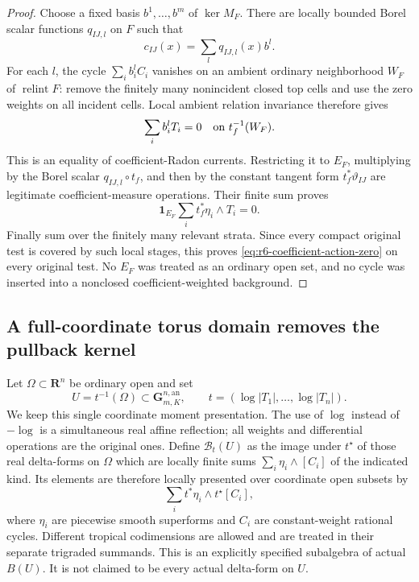 \documentclass[11pt,a4paper]{article}
\numberwithin{equation}{section}
\theoremstyle{definition}
\theoremstyle{remark}
\begin{document}
\begin{proof}
Choose a fixed basis $b^1,\ldots,b^m$ of $\ker M_F$.  There are
locally bounded Borel scalar functions $q_{IJ,l}$ on $F$ such that
\[
                          c_{IJ}(x)=\sum_lq_{IJ,l}(x)b^l.
\]
For each $l$, the cycle $\sum_i b_i^lC_i$ vanishes on an ambient
ordinary neighborhood $W_F$ of $\operatorname{relint}F$: remove
the finitely many nonincident closed top cells and use the zero
weights on all incident cells.  Local ambient relation invariance
therefore gives
\[
                         \sum_i b_i^lT_i=0
                             \quad\hbox{on }t_f^{-1}(W_F).
\]
This is an equality of coefficient-Radon currents.  Restricting
it to $E_F$, multiplying by the Borel scalar
$q_{IJ,l}\circ t_f$, and then by the constant tangent form
$t_f^*\vartheta_{IJ}$ are legitimate coefficient-measure operations.
Their finite sum proves
\[
           \mathbf1_{E_F}\sum_i t_f^*\eta_i\wedge T_i=0.
\]
Finally sum over the finitely many relevant strata.  Since every
compact original test is covered by such local stages, this proves
\eqref{eq:r6-coefficient-action-zero} on every original test.
No $E_F$ was treated as an ordinary open set, and no cycle was
inserted into a nonclosed coefficient-weighted background.
\end{proof}

\subsection{A full-coordinate torus domain removes the pullback kernel}

Let $\Omega\subset\mathbf R^n$ be ordinary open and set
\[
      U=t^{-1}(\Omega)\subset\mathbf G_{m,K}^{n,\mathrm{an}},
       \qquad t=(\log|T_1|,\ldots,\log|T_n|).
\]
We keep this single coordinate moment presentation.  The use of
$\log$ instead of $-\log$ is a simultaneous real affine reflection;
all weights and differential operations are the original ones.
Define $\mathscr B_t(U)$ as the image under $t^\star$ of those real
delta-forms on $\Omega$ which are locally finite sums
$\sum_i\eta_i\wedge[C_i]$ of the indicated kind.  Its elements
are therefore locally presented over coordinate open subsets by
\[
                       \sum_i t^*\eta_i\wedge t^\star[C_i],
\]
where $\eta_i$ are piecewise smooth superforms and $C_i$ are
constant-weight rational cycles.  Different tropical codimensions
are allowed and are treated in their separate trigraded summands.
This is an explicitly specified subalgebra of actual $B(U)$.
It is not claimed to be every actual delta-form on $U$.
\end{document}
